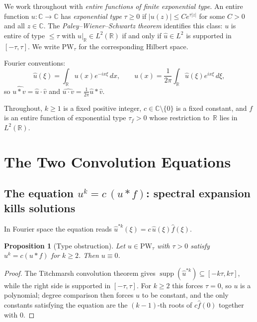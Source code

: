 \documentclass[12pt]{article}
\newtheorem{proposition}[theorem]{Proposition}
\theoremstyle{definition}
\theoremstyle{remark}
\DeclareMathOperator{\supp}{supp}
\newcommand{\R}{\mathbb{R}}
\newcommand{\C}{\mathbb{C}}
\newcommand{\PW}{\mathrm{PW}}
\newcommand{\wh}{\widehat}
\newcommand{\abs}[1]{\left|#1\right|}
\begin{document}
We work throughout with \emph{entire functions of finite exponential type}.
An entire function $u:\C\to\C$ has \emph{exponential type} $\tau\geq 0$ if
$\abs{u(z)}\leq Ce^{\tau\abs{z}}$ for some $C>0$ and all $z\in\C$.
The \emph{Paley--Wiener--Schwartz theorem} identifies this class:
$u$ is entire of type $\leq\tau$ with $u|_{\R}\in L^2(\R)$ if and only if
$\wh u\in L^2$ is supported in $[-\tau,\tau]$.
We write $\PW_\tau$ for the corresponding Hilbert space.

Fourier conventions:
\[
  \wh u(\xi)=\int_\R u(x)e^{-ix\xi}\,dx,
  \qquad
  u(x)=\frac{1}{2\pi}\int_\R \wh u(\xi)e^{ix\xi}\,d\xi,
\]
so $\widehat{u\ast v}=\wh u\cdot\wh v$ and
$\widehat{u\cdot v}=\tfrac{1}{2\pi}\wh u\ast\wh v$.

Throughout, $k\geq 1$ is a fixed positive integer, $c\in\C\setminus\{0\}$
is a fixed constant, and $f$ is an entire function of exponential type
$\tau_f>0$ whose restriction to~$\R$ lies in $L^2(\R)$.

\section{The Two Convolution Equations}
\label{sec:two-eqns}

\subsection{The equation $u^k=c\,(u\ast f)$: spectral expansion kills solutions}

In Fourier space the equation reads
$\wh u^{\ast k}(\xi)=c\,\wh u(\xi)\wh f(\xi)$.

\begin{proposition}[Type obstruction]  \label{prop:type-obstruction}
  Let $u\in\PW_\tau$ with $\tau>0$ satisfy $u^k=c(u\ast f)$ for $k\geq 2$.
  Then $u\equiv 0$.
\end{proposition}

\begin{proof}
  The Titchmarsh convolution theorem gives
  $\supp(\wh u^{\ast k})\subseteq[-k\tau,k\tau]$, while the right side is
  supported in $[-\tau,\tau]$.  For $k\geq 2$ this forces $\tau=0$, so $u$
  is a polynomial; degree comparison then forces $u$ to be constant, and the
  only constants satisfying the equation are the $(k-1)$-th roots of
  $c\wh f(0)$ together with $0$.
\end{proof}
\end{document}
